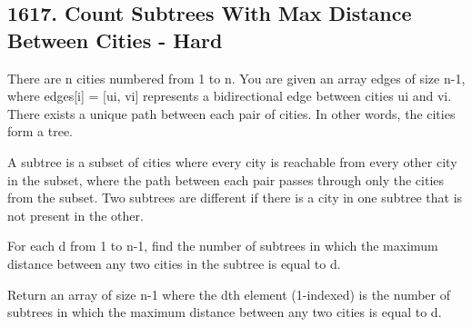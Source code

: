 \documentclass[9pt, b5paaper]{book}
\begin{document}
\subsection{1617. Count Subtrees With Max Distance Between Cities - Hard}
\label{sec-2-1-6}
There are n cities numbered from 1 to n. You are given an array edges of size n-1, where edges[i] = [ui, vi] represents a bidirectional edge between cities ui and vi. There exists a unique path between each pair of cities. In other words, the cities form a tree.

A subtree is a subset of cities where every city is reachable from every other city in the subset, where the path between each pair passes through only the cities from the subset. Two subtrees are different if there is a city in one subtree that is not present in the other.

For each d from 1 to n-1, find the number of subtrees in which the maximum distance between any two cities in the subtree is equal to d.

Return an array of size n-1 where the dth element (1-indexed) is the number of subtrees in which the maximum distance between any two cities is equal to d.
\end{document}
